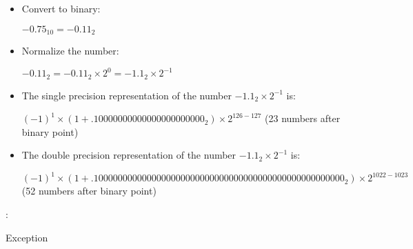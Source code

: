       \begin{itemize}
        \item Convert to binary:
          \par $-0.75_{10} = -0.11_{2}$
        \item Normalize the number:
          \par $-0.11_{2} = -0.11_{2} \times 2^{0} = -1.1_{2} \times 2^{-1}$
        \item The single precision representation of the number $-1.1_{2}
          \times 2^{-1}$ is:
          \par $(-1)^{1} \times (1 + .1000 0000 0000 0000 0000 000_{2}) \times
            2^{126 - 127}$ (23 numbers after binary point)
        \item The double precision representation of the number $-1.1_{2}
          \times 2^{-1}$ is:
          \par $(-1)^{1} \times (1 + .1000 0000 0000 0000 0000 0000 0000 0000
          0000 0000 0000 0000 0000_{2}) \times 2^{1022 - 1023}$ (52 numbers
          after binary point)
      \end{itemize}


    \par {}:
    \begin{algorithm}[H]
      \begin{algorithmic}[1]
          \EndWhile
              \EndWhile
              \EndWhile
            \EndIf
              Exception
            \EndIf
            \State {}
          \EndWhile
        \EndFunction
      \end{algorithmic}
    \end{algorithm}

